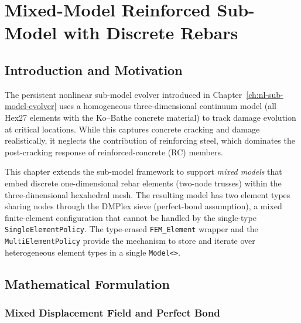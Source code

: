 
\chapter{Mixed-Model Reinforced Sub-Model with Discrete Rebars}
\label{ch:mixed-model-rebar}


\section{Introduction and Motivation}
\label{sec:mixed-intro}

The persistent nonlinear sub-model evolver introduced in
Chapter~\ref{ch:nl-sub-model-evolver} uses a homogeneous three-dimensional
continuum model (all Hex27 elements with the Ko--Bathe concrete
material) to track damage evolution at critical locations.  While this
captures concrete cracking and damage realistically, it neglects the
contribution of reinforcing steel, which dominates the post-cracking
response of reinforced-concrete (RC) members.

This chapter extends the sub-model framework to support \emph{mixed
models} that embed discrete one-dimensional rebar elements (two-node
trusses) within the three-dimensional hexahedral mesh.  The resulting
model has two element types sharing nodes through the DMPlex sieve
(perfect-bond assumption), a mixed finite-element configuration that
cannot be handled by the single-type \texttt{SingleElementPolicy}.  The
type-erased \texttt{FEM\_Element} wrapper and the
\texttt{MultiElementPolicy} provide the mechanism to store and iterate
over heterogeneous element types in a single \texttt{Model<>}.


\section{Mathematical Formulation}
\label{sec:mixed-math}

\subsection{Mixed Displacement Field and Perfect Bond}

